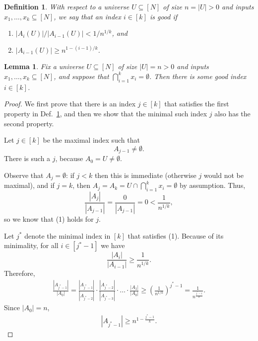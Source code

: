 \documentclass{article}
\theoremstyle{plain}
\newtheorem{lemma}[theorem]{Lemma}
\newtheorem{definition}{Definition}
\begin{document}
\begin{definition}
  With respect to a universe $U \subseteq [N]$ of size $n = |U| > 0$ and inputs $x_1,\ldots,x_k \subseteq [N]$,
  we say that an index $i \in [k]$ is \emph{good} if
  \begin{enumerate}
    \item $|A_i(U)| / |A_{i-1}(U)| < 1/n^{1/k}$, and
    \item $|A_{i-1}(U)| \geq n^{1-(i-1)/k}$.
  \end{enumerate}
  \label{def:good}
\end{definition}

\begin{lemma}
  Fix a universe $U \subseteq [N]$ of size $|U| = n > 0$ and inputs $x_1,\ldots,x_k \subseteq [N]$,
  and suppose that $\bigcap_{i = 1}^k x_i = \emptyset$.
  Then there is some good index $i \in [k]$.
  \label{lemma:narrow}
\end{lemma}
\begin{proof}
  We first prove that there is an index $j \in [k]$ that satisfies the first property in Def.~\ref{def:good}, and then we show
  that the minimal such index $j$ also has the second property.

  Let $j \in [k]$ be the maximal index such that 
  \begin{equation*}
    A_{j-1} \neq \emptyset.
  \end{equation*}
  There is such a $j$, because $A_0 = U \neq \emptyset$.

  Observe that $A_{j} = \emptyset$:
  if $j < k$ then this is immediate (otherwise $j$ would not be maximal),
  and
  if $j = k$, then $A_j = A_k = U \cap \bigcap_{i=1}^k x_i = \emptyset$ by assumption.
  Thus,
  \begin{equation*}
    \frac{|A_j|}{|A_{j-1}|} = \frac{0}{|A_{j-1}|} = 0 < \frac{1}{n^{1/k}},
  \end{equation*}
  so we know that (1) holds for $j$.


  Let $j^{\ast}$ denote the minimal index in $[k]$ that satisfies (1).
  Because of its minimality, for all $i \in [j^\ast-1]$ we have
  \begin{equation*}
    \frac{|A_i|}{|A_{i-1}|} \geq \frac{1}{n^{1/k}}.
  \end{equation*}
  Therefore,
  \begin{align*}
    \frac{|A_{j^\ast - 1}|}{|A_0|} = 
    \frac{|A_{j^\ast - 1}|}{|A_{j^\ast-2}|} \cdot \frac{|A_{j^\ast-2}|}{|A_{j^\ast-3}|} \cdot \ldots \cdot \frac{|A_1|}{|A_0|}
    \geq
    \left(  \frac{1}{n^{1/k}} \right)^{j^\ast - 1}
    =
    \frac{1}{n^{\frac{j^\ast - 1}{k}}}.
  \end{align*}
  Since $|A_0| = n$, 
  \begin{align*}
    |A_{j^\ast - 1}| \geq n^{1 - \frac{j^\ast-1}{k}}.
  \end{align*}
\end{proof}
\end{document}
